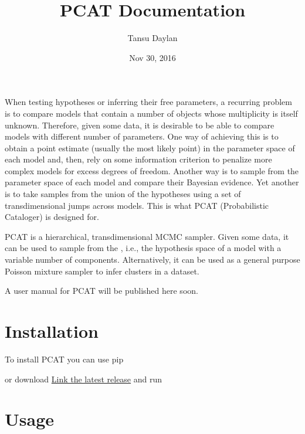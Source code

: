 \documentclass[letterpaper,10pt,english]{sphinxmanual}
\title{PCAT Documentation}
\date{Nov 30, 2016}
\author{Tansu Daylan}
\begin{document}
\maketitle
\sphinxtableofcontents
{}\label{index::doc}


When testing hypotheses or inferring their free parameters, a recurring problem is to compare models that contain a number of objects whose multiplicity is itself unknown. Therefore, given some data, it is desirable to be able to compare models with different number of parameters. One way of achieving this is to obtain a point estimate (usually the most likely point) in the parameter space of each model and, then, rely on some information criterion to penalize more complex models for excess degrees of freedom. Another way is to sample from the parameter space of each model and compare their Bayesian evidence. Yet another is to take samples from the union of the hypotheses using a set of transdimensional jumps across models. This is what PCAT (Probabilistic Cataloger) is designed for.

PCAT is a hierarchical, transdimensional MCMC sampler. Given some data, it can be used to sample from the , i.e., the hypothesis space of a model with a variable number of components. Alternatively, it can be used as a general purpose Poisson mixture sampler to infer clusters in a dataset.

A user manual for PCAT will be published here soon.


\chapter{Installation}
\label{index:installation}\label{index:welcome-to-pcat-s-documentation}
To install PCAT you can use pip

\begin{sphinxVerbatim}[commandchars=\\\{\}]
  
\end{sphinxVerbatim}

or download \href{https://github.com/tdaylan/pcat/releases/}{Link the latest release} and run

\begin{sphinxVerbatim}[commandchars=\\\{\}]
  
\end{sphinxVerbatim}


\chapter{Usage}
\label{index:usage}
\end{document}

